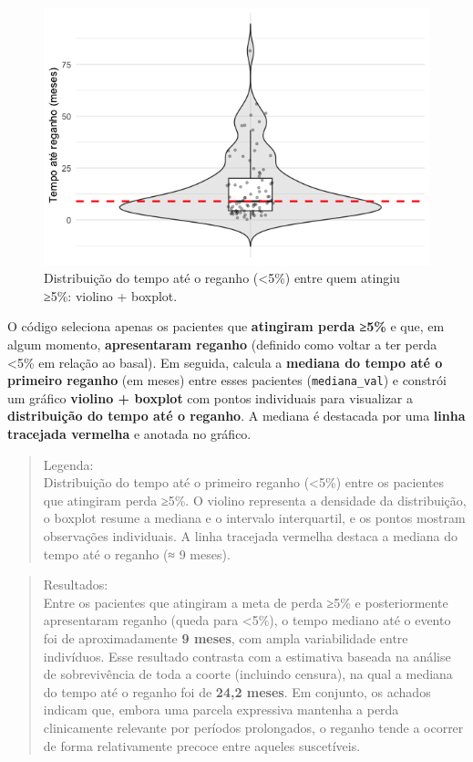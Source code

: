 \documentclass[
]{article}
\begin{document}
\begin{figure}[H]

{\centering \includegraphics[width=1\textwidth,height=\textheight]{outputs/figs/dist-tempo-ate-reganho-violin-1.png}

}

\caption{Distribuição do tempo até o reganho (\textless5\%) entre quem
atingiu ≥5\%: violino + boxplot.}

\end{figure}%

O código seleciona apenas os pacientes que \textbf{atingiram perda ≥5\%}
e que, em algum momento, \textbf{apresentaram reganho} (definido como
voltar a ter perda \textless5\% em relação ao basal). Em seguida,
calcula a \textbf{mediana do tempo até o primeiro reganho} (em meses)
entre esses pacientes (\texttt{mediana\_val}) e constrói um gráfico
\textbf{violino + boxplot} com pontos individuais para visualizar a
\textbf{distribuição do tempo até o reganho}. A mediana é destacada por
uma \textbf{linha tracejada vermelha} e anotada no gráfico.

\begin{quote}
Legenda:\\
Distribuição do tempo até o primeiro reganho (\textless5\%) entre os
pacientes que atingiram perda ≥5\%. O violino representa a densidade da
distribuição, o boxplot resume a mediana e o intervalo interquartil, e
os pontos mostram observações individuais. A linha tracejada vermelha
destaca a mediana do tempo até o reganho (≈ 9 meses).\\
\end{quote}

\begin{quote}
Resultados:\\
Entre os pacientes que atingiram a meta de perda ≥5\% e posteriormente
apresentaram reganho (queda para \textless5\%), o tempo mediano até o
evento foi de aproximadamente \textbf{9 meses}, com ampla variabilidade
entre indivíduos. Esse resultado contrasta com a estimativa baseada na
análise de sobrevivência de toda a coorte (incluindo censura), na qual a
mediana do tempo até o reganho foi de \textbf{24,2 meses}. Em conjunto,
os achados indicam que, embora uma parcela expressiva mantenha a perda
clinicamente relevante por períodos prolongados, o reganho tende a
ocorrer de forma relativamente precoce entre aqueles suscetíveis.
\end{quote}
\end{document}
